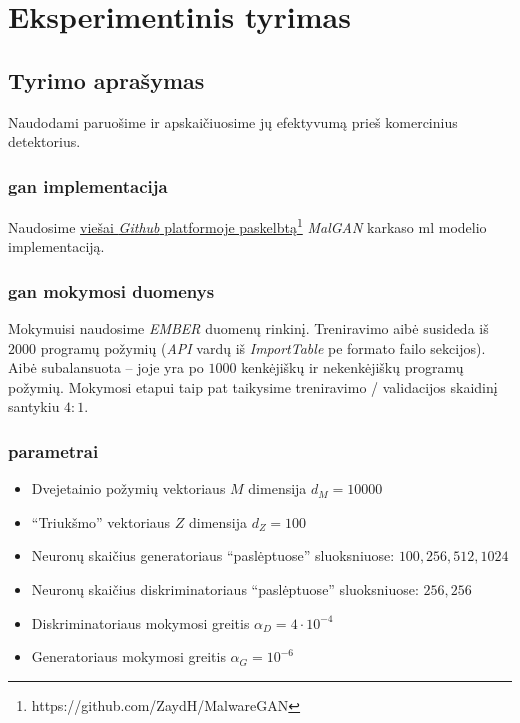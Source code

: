 \section{Eksperimentinis tyrimas}\label{sec:experiment}

\subsection{Tyrimo aprašymas}
Naudodami   paruošime
 ir apskaičiuosime jų efektyvumą prieš komercinius
detektorius.

\subsubsection{\acs{gan} implementacija} Naudosime \href{https://github.com/ZaydH/MalwareGAN}{viešai
    \textit{Github} platformoje
    paskelbtą\footnote{https://github.com/ZaydH/MalwareGAN}} \textit{MalGAN}
karkaso \acs{ml} modelio implementaciją.



\subsubsection{\acs{gan} mokymosi duomenys} Mokymuisi naudosime \textit{EMBER}
\cite{andersonEMBEROpenDataset2018a} duomenų rinkinį. Treniravimo aibė susideda
iš $2000$ programų požymių (\textit{API} vardų iš \textit{ImportTable} \acs{pe}
formato failo sekcijos). Aibė subalansuota -- joje yra po $1000$ kenkėjiškų ir
nekenkėjiškų programų požymių. Mokymosi etapui taip pat taikysime treniravimo /
validacijos skaidinį santykiu $4:1$.

\subsubsection{ parametrai}
\begin{itemize}
    \item Dvejetainio požymių vektoriaus $M$ dimensija $d_M = 10000$
    \item \enquote{Triukšmo} vektoriaus $Z$ dimensija $d_Z=100$
    \item Neuronų skaičius generatoriaus \enquote{paslėptuose} sluoksniuose:
          $100,256,512,1024$
    \item Neuronų skaičius diskriminatoriaus \enquote{paslėptuose} sluoksniuose:
          $256,256$
    \item Diskriminatoriaus mokymosi greitis $\alpha_D = 4\cdot 10^{-4}$
    \item Generatoriaus mokymosi greitis $\alpha_G = 10^{-6}$
\end{itemize}

